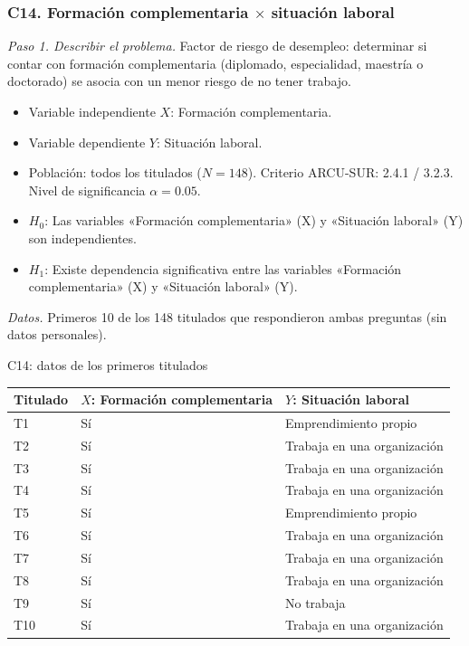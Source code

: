 \subsubsection*{C14. Formación complementaria $\times$ situación laboral}

\textit{Paso 1. Describir el problema.} Factor de riesgo de desempleo: determinar si contar con formación complementaria (diplomado, especialidad, maestría o doctorado) se asocia con un menor riesgo de no tener trabajo.

\begin{itemize}[nosep]
  \item Variable independiente $X$: Formación complementaria.
  \item Variable dependiente $Y$: Situación laboral.
  \item Población: todos los titulados ($N = 148$). Criterio ARCU-SUR: 2.4.1 / 3.2.3. Nivel de significancia $\alpha = 0.05$.
  \item $H_0$: Las variables «Formación complementaria» (X) y «Situación laboral» (Y) son independientes.
  \item $H_1$: Existe dependencia significativa entre las variables «Formación complementaria» (X) y «Situación laboral» (Y).
\end{itemize}

\textit{Datos.} Primeros 10 de los 148 titulados que respondieron ambas preguntas (sin datos personales).

\begin{mitabla}{C14: datos de los primeros titulados}
\begin{tabular}{lll}
\toprule
Titulado & $X$: Formación complementaria & $Y$: Situación laboral \\
\midrule
T1 & Sí & Emprendimiento propio \\
T2 & Sí & Trabaja en una organización \\
T3 & Sí & Trabaja en una organización \\
T4 & Sí & Trabaja en una organización \\
T5 & Sí & Emprendimiento propio \\
T6 & Sí & Trabaja en una organización \\
T7 & Sí & Trabaja en una organización \\
T8 & Sí & Trabaja en una organización \\
T9 & Sí & No trabaja \\
T10 & Sí & Trabaja en una organización \\
\bottomrule
\end{tabular}
\end{mitabla}

